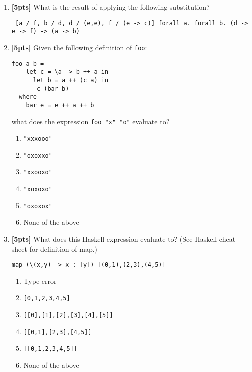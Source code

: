 \documentclass[paper=letter, fontsize=13pt]{article} %
\numberwithin{equation}{section} %
\newif\ifshowanswers\showanswersfalse
\begin{document}
\begin{enumerate}
\item \textbf{[5pts]} What is the result of applying the following substitution? 
\begin{verbatim}
 [a / f, b / d, d / (e,e), f / (e -> c)] forall a. forall b. (d -> e -> f) -> (a -> b)
\end{verbatim}
  \ifshowanswers
  \begin{verbatim}
  forall a. forall b. ((e,e) -> e -> (e -> c)) -> (a -> b)
 \end{verbatim}
\else
  \bigskip
  \bigskip
  \bigskip
  \bigskip
  \bigskip
  \bigskip
  \bigskip
  \bigskip
  \bigskip
  \bigskip
  \bigskip
  \fi
  

\newpage
{}
\bigskip
\bigskip
\bigskip

\item \textbf{[5pts]} Given the following definition of \texttt{foo}:
\begin{lstlisting}
foo a b = 
    let c = \a -> b ++ a in
      let b = a ++ (c a) in
       c (bar b)
  where 
    bar e = e ++ a ++ b
\end{lstlisting}
  what does the expression \texttt{foo "x" "o"} evaluate to?
\begin{enumerate}
\item \texttt{"xxxooo"}
\item \texttt{"oxoxxo"}
\item \texttt{"xxooxo"}
\item \texttt{"xoxoxo"}
\item \texttt{"oxoxox"}
\item None of the above
\end{enumerate}

\item \textbf{[5pts]}  What does this Haskell expression evaluate to?
  (See Haskell cheat sheet for definition of map.)
\begin{lstlisting}
map (\(x,y) -> x : [y]) [(0,1),(2,3),(4,5)]
\end{lstlisting}
  \begin{enumerate}
    \item Type error
    \item \verb|[0,1,2,3,4,5]|
    \item \verb|[[0],[1],[2],[3],[4],[5]]|
    \item \verb|[[0,1],[2,3],[4,5]]|
    \item \verb|[[0,1,2,3,4,5]]|
    \item None of the above
  \end{enumerate}


\end{enumerate}
\end{document}

